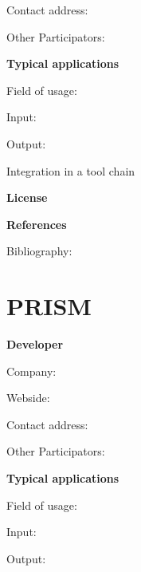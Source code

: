 \documentclass{./template/openetcs_report}
\begin{document}
	Contact address:

	Other  Participators:



	\textbf{Typical applications}

	Field of usage:


	Input:

	Output:





	Integration in a tool chain



	\textbf{License}


	\textbf{References}

	Bibliography:


\section{PRISM}
	\textbf{Developer}

	Company: 

	Webside:

	Contact address:

	Other  Participators:



	\textbf{Typical applications}

	Field of usage:


	Input:

	Output:



\end{document}
